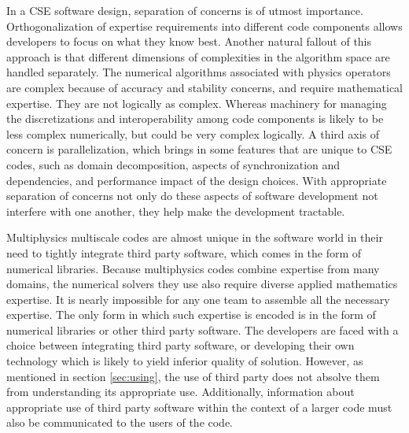 In a CSE software design, separation of concerns is of utmost
importance. Orthogonalization of expertise requirements into different code
components allows developers to focus on what they know best.  
Another natural fallout of this approach is that different dimensions of
complexities in the algorithm space are handled separately. The
numerical algorithms associated with physics operators are complex
because of accuracy and stability concerns, and require mathematical
expertise. They are not logically as complex. Whereas machinery for
managing the discretizations and interoperability among code
components is likely to be less complex numerically, but could be very
complex logically. A third axis of concern is parallelization, which
brings in some features that are unique to CSE codes, such as domain
decomposition, aspects of synchronization and dependencies, and
performance impact of the design choices. With appropriate separation
of concerns not only do these aspects of software development not 
interfere with one another, they help make the development tractable. 

Multiphysics multiscale codes are almost unique in the software world
in their need to tightly integrate third party software, which comes
in the form of numerical libraries. Because multiphysics codes combine
expertise from many domains, the numerical solvers they use also
require diverse applied mathematics expertise. It is nearly impossible
for any one team to assemble all the necessary expertise. The only
form in which such expertise is encoded is in the form of numerical
libraries or other third party software. The developers are faced with
a choice between integrating third party software, or developing their
own technology which is likely to yield inferior quality of
solution. However, as mentioned in section \ref{sec:using}, the use of
third party does not absolve them from understanding its appropriate
use. Additionally, information about appropriate use of third party
software within the context of a larger code must also be communicated
to the users of the code.

